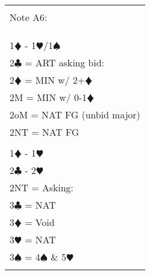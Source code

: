 \documentclass{article}
\newcommand\C{\ensuremath{\clubsuit}}
\newcommand\D{\color{red}\ensuremath{\vardiamondsuit}}
\renewcommand\H{\color{red}\ensuremath{\varheartsuit}}
\renewcommand\S{\ensuremath{\spadesuit}}
\newcommand\N{{\footnotesize NT}}
\begin{document}
\begin{tabular}{|l|}
\hline \\[-1em]
\cellcolor{green!25} \Large Note A6: \\[-1em] 
\\ \hline
\\
\\ \Large 1{\D} - 1{\H}/{1\S} 
\\ \Large {2\C} = ART asking bid: 
\\ \Large \hspace{10mm} {2\D} = MIN w/ 2+{\D}
\\ \Large \hspace{10mm} 2M = MIN w/ 0-1{\D}
\\ \Large \hspace{10mm} 2oM = NAT FG (unbid major)
\\ \Large \hspace{10mm} 2{\N} = NAT FG 
\\
\\ \Large 1{\D} - 1{\H} 
\\ \Large 2{\C} - 2{\H}
\\ \Large 2{\N} = Asking:
\\ \Large \hspace{10mm} 3{\C} = NAT 
\\ \Large \hspace{10mm} 3{\D} = Void 
\\ \Large \hspace{10mm} 3{\H} = NAT 
\\ \Large \hspace{10mm} 3{\S} = 4{\S} \& 5{\H}
\\
\\ \hline
\end{tabular}
\end{document}
